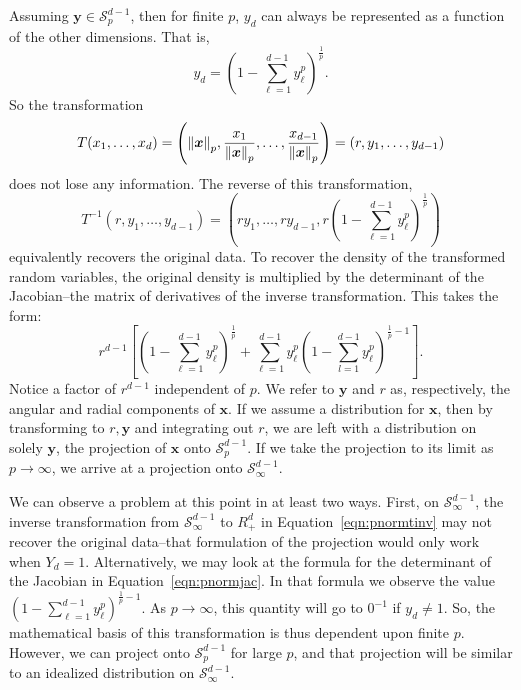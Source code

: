 Assuming $\bm{y} \in \mathcal{S}_{p}^{d-1}$, then for finite $p$, $y_d$ can always be represented
  as a function of the other dimensions.  That is,
  \begin{equation*}
    y_d = \left(1 - {\textstyle\sum}_{\ell = 1}^{d-1}y_{\ell}^p\right)^{\frac{1}{p}}.
  \end{equation*}
  So the transformation
  \begin{equation}
    \label{eqn:pnormt}
    T(x_1,\ldots,x_d) = \left(\pnorm{\bm{x}}{p}, \frac{x_1}{\pnorm{\bm{x}}{p}},
                          \ldots , \frac{x_{d-1}}{\pnorm{\bm{x}}{p}}\right) = (r,y_1,\ldots,y_{d-1})
  \end{equation}
  does not lose any information.  The reverse of this transformation,
  \begin{equation}
    \label{eqn:pnormtinv}
    T^{-1}\left(r,y_1,\ldots,y_{d-1}\right) =
      \left(ry_1,\ldots,ry_{d-1}, r\left(1 - {\textstyle\sum}_{\ell = 1}^{d-1}y_{\ell}^p\right)^{\frac{1}{p}}\right)
  \end{equation}
  equivalently recovers the original data.  To recover the density of the transformed random variables,
  the original density is multiplied by the determinant of the Jacobian--the matrix of derivatives
  of the inverse transformation.  This takes the form:
  \begin{equation}
    \label{eqn:pnormjac}
    r^{d-1}\left[\left(1 - {\textstyle\sum}_{\ell = 1}^{d-1}y_{\ell}^p\right)^{\frac{1}{p}} +
        {\textstyle\sum}_{\ell = 1}^{d-1}y_{\ell}^p\left(1 - {\textstyle\sum}_{l=1}^{d-1} y_{\ell}^p\right)^{\frac{1}{p} - 1}\right].
  \end{equation}
  Notice a factor of $r^{d-1}$ independent of $p$. We refer to $\bm{y}$ and $r$ as, respectively,
  the angular and radial components of $\bm{x}$.  If we assume a distribution for $\bm{x}$, then
  by transforming to $r, \bm{y}$ and integrating out $r$, we are left with a distribution on solely
  $\bm{y}$, the projection of $\bm{x}$ onto $\mathcal{S}_{p}^{d-1}$.  If we take the projection to
  its limit as $p\to\infty$, we arrive at a projection onto $\mathcal{S}_{\infty}^{d-1}$.

We can observe a problem at this point in at least two ways.  First, on $\mathcal{S}_{\infty}^{d-1}$, the
  inverse transformation from $\mathcal{S}_{\infty}^{d-1}$ to $R_+^{d}$ in Equation~\ref{eqn:pnormtinv}
  may not recover the original data--that formulation of the projection would only work when $Y_d = 1$.
  Alternatively, we may look at the formula for the determinant of the Jacobian in
  Equation~\ref{eqn:pnormjac}.  In that formula we observe the value
  $(1 - \sum_{\ell = 1}^{d-1}y_{\ell}^p)^{\frac{1}{p} - 1}$.  As $p\to\infty$,
  this quantity will go to $0^{-1}$ if $y_d \neq 1$.
  So, the mathematical basis of this transformation is thus dependent upon finite $p$.  However, we can
  project onto $\mathcal{S}_p^{d-1}$ for large $p$, and that projection will be similar to an idealized
  distribution on $\mathcal{S}_{\infty}^{d-1}$.

